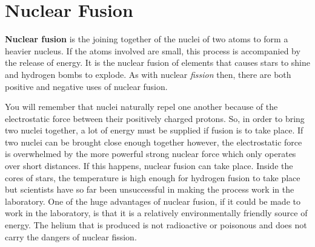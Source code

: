 






\section{Nuclear Fusion}
\label{sec:an:nfus}

\textbf{Nuclear fusion} is the joining together of the nuclei of two atoms to form a heavier nucleus. If the atoms involved are small, this process is accompanied by the release of energy. It is the nuclear fusion of elements that causes stars to shine and hydrogen bombs to explode. As with nuclear \textit{fission} then, there are both positive and negative uses of nuclear fusion. 


You will remember that nuclei naturally repel one another because of the electrostatic force between their positively charged protons. So, in order to bring two nuclei together, a lot of energy must be supplied if fusion is to take place. If two nuclei can be brought close enough together however, the electrostatic force is overwhelmed by the more powerful strong nuclear force which only operates over short distances. If this happens, nuclear fusion can take place. Inside the cores of stars, the temperature is high enough for hydrogen fusion to take place but scientists have so far been unsuccessful in making the process work in the laboratory. One of the huge advantages of nuclear fusion, if it could be made to work in the laboratory, is that it is a relatively environmentally friendly source of energy. The helium that is produced is not radioactive or poisonous and does not carry the dangers of nuclear fission.\\



